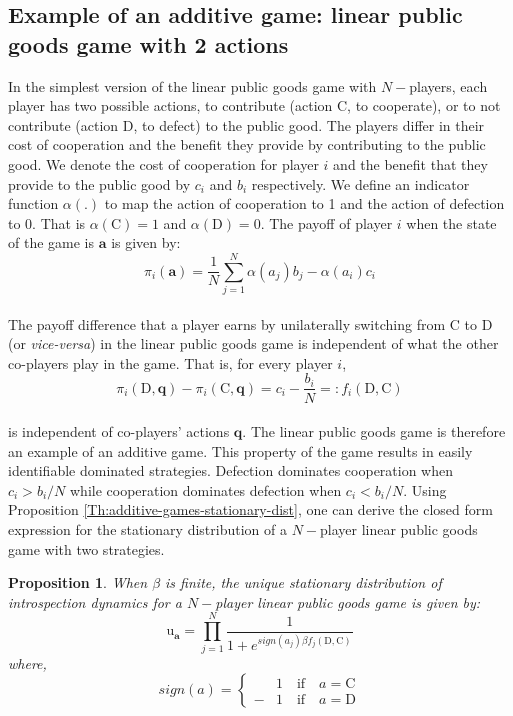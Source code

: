 \documentclass[11pt]{article}
\theoremstyle{plainCl1}
\newtheorem{Prop}{Proposition}
\theoremstyle{plainCl2}
\newcommand{\abf}{\mathbf{a}}
\newcommand{\qbf}{\mathbf{q}}
\newcommand{\C}{\mathrm{C}}
\newcommand{\D}{\mathrm{D}}
\begin{document}
\subsection*{Example of an additive game: linear public goods game with 2 actions}
In the simplest version of the linear public goods game with $N-$players, each player has two possible actions, to contribute (action $\C$, to cooperate), or to not contribute (action $\D$, to defect) to the public good. The players differ in their cost of cooperation and the benefit they provide by contributing to the public good. We denote the cost of cooperation for player $i$ and the benefit that they provide to the public good by $c_i$ and $b_i$ respectively. We define an indicator function $\alpha(.)$ to map the action of cooperation to 1 and the action of defection to 0. That is $\alpha(\C) = 1$ and $\alpha(\D) = 0$.  The payoff of player $i$ when the state of the game is $\abf$ is given by: \\
\begin{equation}
\pi_i(\abf) = \frac{1}{N}\sum_{j=1}^N \displaystyle \alpha(a_j) b_j - \alpha(a_i) c_i
\label{Eq:linear-pgg-payoff}
\end{equation}
\\
\noindent The payoff difference that a player earns by unilaterally switching from $\C$ to $\D$ (or \emph{vice-versa}) in the linear public goods game is independent of what the other co-players play in the game. That is, for every player $i$,
\begin{equation}
\pi_i(\D, \qbf) - \pi_i(\C, \qbf) = c_i - \frac{b_i}{N} =: f_i(\D, \C) 
\label{Eq:difference-payoffs-lpgg}
\end{equation}\\
\noindent is independent of co-players' actions $\qbf$. The linear public goods game is therefore an example of an additive game. This property of the game results in easily identifiable dominated strategies. Defection dominates cooperation when $c_i > b_i/N$ while cooperation dominates defection when $c_i < b_i/N$. Using Proposition \ref{Th:additive-games-stationary-dist}, one can derive the closed form expression for the stationary distribution of a $N-$player linear public goods game with two strategies. 
\begin{Prop}
\label{prop:stationary-dist-lpgg}
When $\beta$ is finite, the unique stationary distribution of introspection dynamics for a $N-$player linear public goods game is given by: 
\\
\begin{equation}
\mathrm{u}_\abf = \prod_{j = 1}^{N} \frac{1}{1 + \displaystyle e^{\mathit{sign}(a_j)\beta f_j(\D, \C )}} 
\label{Eq:stationary_dist_lpgg}
\end{equation}
where, 
\begin{equation}
\label{Eq:sign-function}
\mathit{sign}(a) =
\begin{cases}
&1 \quad \text{if} \quad a = \C \\
-&1 \quad \text{if} \quad a = \D
\end{cases}
\end{equation} \\
\end{Prop}
\end{document}
